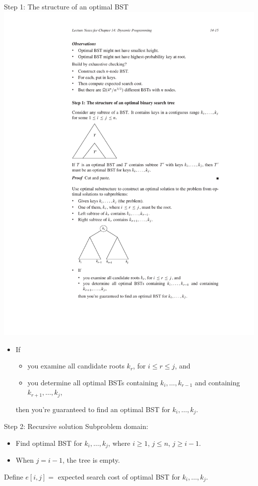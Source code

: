 \documentclass[aspectratio=169]{beamer}
\begin{document}
\begin{frame}{Step 1: The structure of an optimal BST}
    \includegraphics[width=\textwidth, trim={4cm 6cm 4cm 18.25cm}, clip]{figures/BST_step1}
    \begin{itemize}
        \item If
            \begin{itemize}
                \item you examine all candidate roots $k_r$, for $i \leq r \leq j$, and
                \item you determine all optimal BSTs containing $k_i, \ldots, k_{r-1}$ and containing $k_{r+1}, \ldots, k_j$,
            \end{itemize}
        then you're guaranteed to ﬁnd an optimal BST for $k_i, \ldots, k_j$.
    \end{itemize}
\end{frame}

\begin{frame}{Step 2: Recursive solution}
    Subproblem domain:
    \begin{itemize}
        \item Find optimal BST for $k_i, \ldots, k_j$, where $i \geq 1$, $j \leq n$, $j \geq i - 1$.
        \item When $j = i - 1$, the tree is empty.
    \end{itemize}
    Define $e[i, j] = $ expected search cost of optimal BST for $k_i, \dots, k_j$.
\end{frame}
\end{document}
